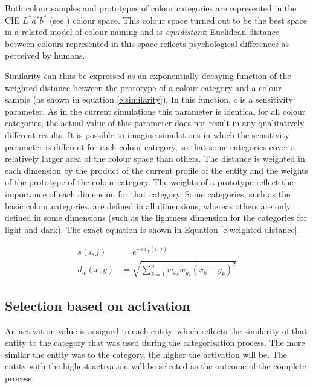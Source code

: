 Both colour samples and prototypes of colour categories are
represented in the CIE $L^*a^*b^*$ (see ) colour
space. This colour space turned out to be the best space in a related
model of colour naming \citep{lammens94computational} and is
\emph{equidistant}: Euclidean distance between colours represented in
this space reflects psychological differences as perceived by humans.

Similarity can thus be expressed as an exponentially decaying function
\citep{shepard87toward, gardenfors04conceptual} of the weighted
distance between the prototype of a colour category and a colour
sample (as shown in equation \ref{e:similarity}). In this function,
$c$ is a sensitivity parameter. As in the current simulations this
parameter is identical for all colour categories, the actual value of
this parameter does not result in any qualitatively different
results. It is possible to imagine simulations in which the
sensitivity parameter is different for each colour category, so that some 
categories cover a relatively larger area of the
colour space than others. The distance is weighted in each dimension by the
product of the current profile of the entity and the weights of the
prototype of the colour category. The weights of a prototype reflect
the importance of each dimension for that category. Some categories,
such as the basic colour categories, are defined in all dimensions,
whereas others are only defined in some dimensions (such as the
lightness dimension for the categories for light and dark). The exact
equation is shown in Equation \ref{e:weighted-distance}.

\begin{align}
s(i,j) &= e^{-cd_w(i,j)}
\label{e:similarity} \\
d_w(x,y) &= \sqrt{\sum_{k=1}^n w_{x_k}w_{y_k} (x_k - y_k)^2}
\label{e:weighted-distance}
\end{align}

\subsection{Selection based on activation}

An activation value is assigned to each entity, which reflects the
similarity of that entity to the category that was used during the
categorisation process. The more similar the entity was to the
category, the higher the activation will be. The entity with the
highest activation will be selected as the outcome of the complete
process.

